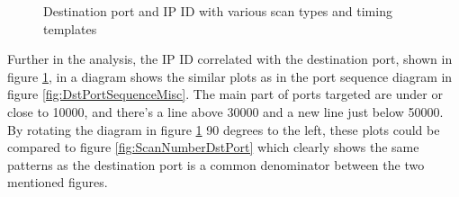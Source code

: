 \begin{figure}[!ht]
    \caption{Destination port and IP ID with various scan types and timing templates}%
    \label{fig:DstIPIDSequenceMisc}%
\end{figure}

Further in the analysis, the IP ID correlated with the destination port, shown in figure \ref{fig:DstIPIDSequenceMisc}, in a diagram shows the similar plots as in the port sequence diagram in figure \ref{fig:DstPortSequenceMisc}. The main part of ports targeted are under or close to 10000, and there's a line above 30000 and a new line just below 50000.
By rotating the diagram in figure \ref{fig:DstIPIDSequenceMisc} 90 degrees to the left, these plots could be compared to figure \ref{fig:ScanNumberDstPort} which clearly shows the same patterns as the destination port is a common denominator between the two mentioned figures.
